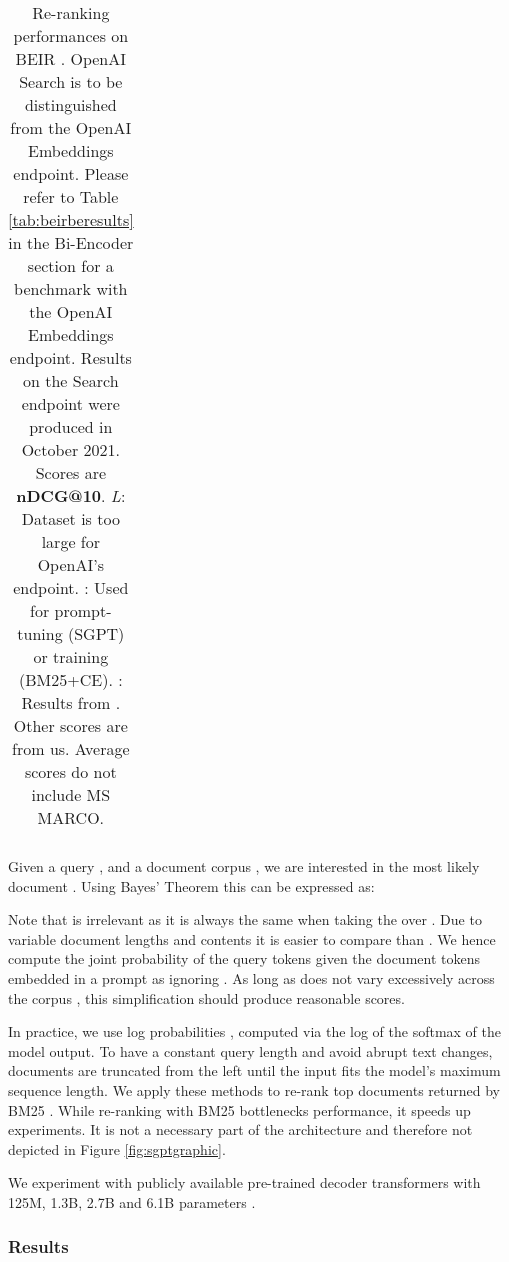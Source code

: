 \documentclass{article}
\begin{document}
\begin{table*}[t!]
{\begin{tabular}{l | c | c c | c c c c | c }
    \bottomrule
    \end{tabular}}
    \caption{Re-ranking performances on BEIR \cite{thakur2021beir}. OpenAI Search is to be distinguished from the OpenAI Embeddings endpoint. Please refer to Table \ref{tab:beirberesults} in the Bi-Encoder section for a benchmark with the OpenAI Embeddings endpoint. Results on the Search endpoint were produced in October 2021. Scores are \textbf{nDCG@10}. \textit{L}: Dataset is too large for OpenAI's endpoint. : Used for prompt-tuning (SGPT) or training (BM25+CE). : Results from \cite{thakur2021beir}. Other scores are from us. Average scores do not include MS MARCO.}
\label{tab:beirceresults}
\end{table*}


Given a query , and a document corpus , we are interested in the most likely document . Using Bayes' Theorem this can be expressed as:



Note that  is irrelevant as it is always the same when taking the  over . Due to variable document lengths and contents it is easier to compare  than . We hence compute the joint probability of the query tokens  given the document tokens embedded in a prompt  as  ignoring . As long as  does not vary excessively across the corpus , this simplification should produce reasonable scores.

In practice, we use log probabilities \cite{brown2020language, radford2019language}, computed via the log of the softmax of the model output. To have a constant query length  and avoid abrupt text changes, documents are truncated from the left until the input fits the model's maximum sequence length. We apply these methods to re-rank top  documents returned by BM25 \cite{robertson2009probabilistic}. While re-ranking with BM25 bottlenecks performance, it speeds up experiments. It is not a necessary part of the architecture and therefore not depicted in Figure \ref{fig:sgptgraphic}. 

We experiment with publicly available pre-trained decoder transformers with 125M, 1.3B, 2.7B and 6.1B parameters \cite{gpt-neox, gpt-j}.

\subsubsection{Results}\label{sec:ceasymres}
\end{document}
